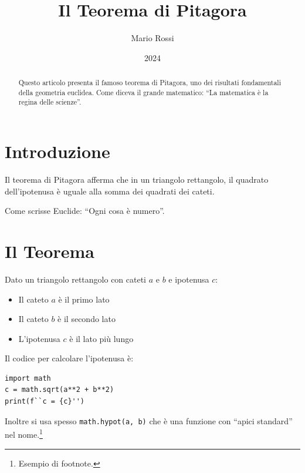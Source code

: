 \documentclass{article}
\title{Il Teorema di Pitagora}
\author{Mario Rossi}
\date{2024}
\begin{document}
\maketitle

\begin{abstract}
Questo articolo presenta il famoso teorema di Pitagora, uno dei risultati
fondamentali della geometria euclidea. Come diceva il grande matematico:
``La matematica è la regina delle scienze''.
\end{abstract}

\section{Introduzione}

Il teorema di Pitagora afferma che in un triangolo rettangolo, il quadrato
dell'ipotenusa è uguale alla somma dei quadrati dei cateti.

Come scrisse Euclide: ``Ogni cosa è numero''.

\section{Il Teorema}

Dato un triangolo rettangolo con cateti $a$ e $b$ e ipotenusa $c$:

\begin{itemize}
  \item Il cateto $a$ è il primo lato
  \item Il cateto $b$ è il secondo lato
  \item L'ipotenusa $c$ è il lato più lungo
\end{itemize}

Il codice per calcolare l'ipotenusa è:

\begin{verbatim}
import math
c = math.sqrt(a**2 + b**2)
print(f``c = {c}'')
\end{verbatim}

Inoltre si usa spesso \texttt{math.hypot(a, b)} che è una funzione con ``apici standard'' nel nome.\footnote{Esempio di footnote.}
\end{document}
